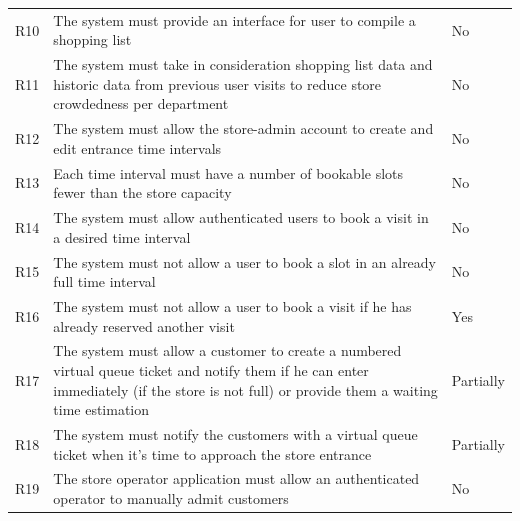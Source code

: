 \begin{tabular}{C{1cm}L{11cm}C{3.1cm}}
    R10   & The system must provide an interface for user to compile a shopping list                                                                                                                    & No           \\
    R11   & The system must take in consideration shopping list data and historic data from previous user visits to reduce store crowdedness per department                                             & No           \\
    R12   & The system must allow the store-admin account to create and edit entrance time intervals                                                                                                    & No           \\
    R13   & Each time interval must have a number of bookable slots fewer than the store capacity                                                                                                       & No           \\
    R14   & The system must allow authenticated users to book a visit in a desired time interval                                                                                                        & No           \\
    R15   & The system must not allow a user to book a slot in an already full time interval                                                                                                            & No           \\
    R16   & The system must not allow a user to book a visit if he has already reserved another visit                                                                                                   & Yes          \\
    R17   & The system must allow a customer to create a numbered virtual queue ticket and notify them if he can enter immediately (if the store is not full) or provide them a waiting time estimation & Partially    \\
    R18   & The system must notify the customers with a virtual queue ticket when it's time to approach the store entrance                                                                              & Partially    \\
    R19   & The store operator application must allow an authenticated operator to manually admit customers                                                                                             & No           \\
\end{tabular}


